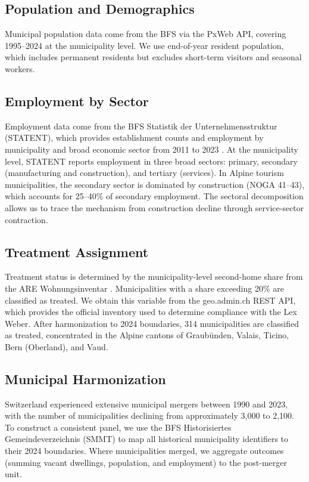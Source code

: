 \documentclass[12pt]{article}
\begin{document}
\subsection{Population and Demographics}

Municipal population data come from the BFS via the PxWeb API, covering 1995--2024 at the municipality level. We use end-of-year resident population, which includes permanent residents but excludes short-term visitors and seasonal workers.

\subsection{Employment by Sector}

Employment data come from the BFS Statistik der Unternehmensstruktur (STATENT), which provides establishment counts and employment by municipality and broad economic sector from 2011 to 2023 \citep{bfs2023statent}. At the municipality level, STATENT reports employment in three broad sectors: primary, secondary (manufacturing and construction), and tertiary (services). In Alpine tourism municipalities, the secondary sector is dominated by construction (NOGA 41--43), which accounts for 25--40\% of secondary employment. The sectoral decomposition allows us to trace the mechanism from construction decline through service-sector contraction.

\subsection{Treatment Assignment}

Treatment status is determined by the municipality-level second-home share from the ARE Wohnungsinventar \citep{are2023wohnungsinventar}. Municipalities with a share exceeding 20\% are classified as treated. We obtain this variable from the geo.admin.ch REST API, which provides the official inventory used to determine compliance with the Lex Weber. After harmonization to 2024 boundaries, 314 municipalities are classified as treated, concentrated in the Alpine cantons of Graub\"{u}nden, Valais, Ticino, Bern (Oberland), and Vaud.

\subsection{Municipal Harmonization}

Switzerland experienced extensive municipal mergers between 1990 and 2023, with the number of municipalities declining from approximately 3,000 to 2,100. To construct a consistent panel, we use the BFS Historisiertes Gemeindeverzeichnis (SMMT) to map all historical municipality identifiers to their 2024 boundaries. Where municipalities merged, we aggregate outcomes (summing vacant dwellings, population, and employment) to the post-merger unit.
\end{document}
